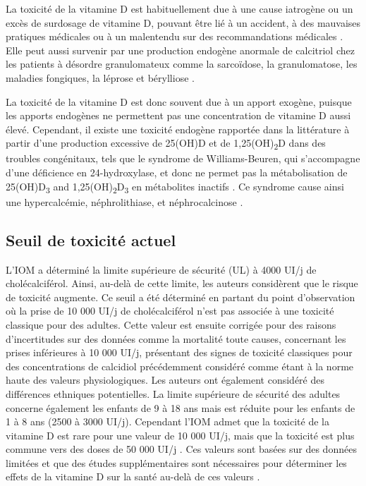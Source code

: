 \documentclass[
  a4paper,
  DIV=11,
  numbers=noendperiod,
  listof=totoc]{scrreprt}
\begin{document}
La toxicité de la vitamine D est habituellement due à une cause
iatrogène ou un excès de surdosage de vitamine D, pouvant être lié à un
accident, à des mauvaises pratiques médicales ou à un malentendu sur des
recommandations médicales \autocite{Lim.2020vd}. Elle peut aussi
survenir par une production endogène anormale de calcitriol chez les
patients à désordre granulomateux comme la sarcoïdose, la granulomatose,
les maladies fongiques, la léprose et bérylliose
\autocite{Marcinowska-Suchowierska.2018}.

La toxicité de la vitamine D est donc souvent due à un apport exogène,
puisque les apports endogènes ne permettent pas une concentration de
vitamine D aussi élevé. Cependant, il existe une toxicité endogène
rapportée dans la littérature à partir d'une production excessive de
25(OH)D et de 1,25(OH)\textsubscript{2}D dans des troubles congénitaux,
tels que le syndrome de Williams-Beuren, qui s'accompagne d'une
déficience en 24-hydroxylase, et donc ne permet pas la métabolisation de
25(OH)D\textsubscript{3} and 1,25(OH)\textsubscript{2}D\textsubscript{3}
en métabolites inactifs \autocite{Marcinowska-Suchowierska.2018}. Ce
syndrome cause ainsi une hypercalcémie, néphrolithiase, et
néphrocalcinose \autocite{Azer.2021}.

\subsection{Seuil de toxicité actuel}\label{seuil-de-toxicituxe9-actuel}

L'\ac{IOM} a déterminé la limite supérieure de sécurité (\ac{UL}) à 4000
UI/j de cholécalciférol. Ainsi, au-delà de cette limite, les auteurs
considèrent que le risque de toxicité augmente. Ce seuil a été déterminé
en partant du point d'observation où la prise de 10 000 UI/j de
cholécalciférol n'est pas associée à une toxicité classique pour des
adultes. Cette valeur est ensuite corrigée pour des raisons
d'incertitudes sur des données comme la mortalité toute causes,
concernant les prises inférieures à 10 000 UI/j, présentant des signes
de toxicité classiques pour des concentrations de calcidiol précédemment
considéré comme étant à la norme haute des valeurs physiologiques. Les
auteurs ont également considéré des différences ethniques potentielles.
La limite supérieure de sécurité des adultes concerne également les
enfants de 9 à 18 ans mais est réduite pour les enfants de 1 à 8 ans
(2500 à 3000 UI/j). Cependant l'\ac{IOM} admet que la toxicité de la
vitamine D est rare pour une valeur de 10 000 UI/j, mais que la toxicité
est plus commune vers des doses de 50 000 UI/j . Ces valeurs sont basées
sur des données limitées et que des études supplémentaires sont
nécessaires pour déterminer les effets de la vitamine D sur la santé
au-delà de ces valeurs \autocite{IOM.2011}.
\end{document}
